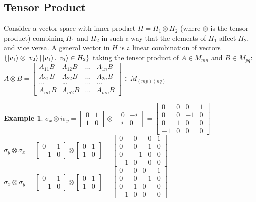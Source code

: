 \documentclass[12pt]{article}
\theoremstyle{plain}
\theoremstyle{nonumberplain}
\theoremstyle{plain}
\newtheorem{example}[lemma]{Example}
\theoremstyle{nonumberplain}
\newcommand\1{{\bf 1}}
\newcommand{\bmat}[1]{\begin{bmatrix*} #1 \end{bmatrix*}} %
\newcommand{\<}{\left\langle}
\renewcommand{\>}{\right\rangle}
\begin{document}
\subsection{Tensor Product}
Consider a vector space with inner product $H=H_1\otimes H_2$ (where $\otimes$ is the tensor product) combining $H_1$ and $H_2$ in such a way that the elements of $H_1$ affect $H_2$, and vice versa. A general vector in $H$ is a linear combination of vectors $\lbrace\ket{v_1}\otimes\ket{v_2}\vert\ket{v_1},\ket{v_2}\in H_2\rbrace$ taking the tensor product of $A\in M_{mn}$ and $B\in M_{pq}$: \\
$A\otimes B=\bmat{
A_{11}B & A_{12}B & ... & A_{1n}B \\
A_{21}B & A_{22}B & ... & A_{2n}B \\
... & ... & ... & ... \\
A_{m1}B & A_{m2}B & ... & A_{mn}B
}\in M_{(mp)(nq)}$

\begin{example}
$\sigma_x\otimes i\sigma_y=\bmat{0 & 1 \\ 1 & 0}\otimes\bmat{0 & -i \\ i & 0}=
\bmat{
0 & 0 & 0 & 1 \\
0 & 0 & -1 & 0 \\
0 & 1 & 0 & 0 \\
-1 & 0 & 0 & 0
}$ \\
$\sigma_y\otimes \sigma_x=\bmat{0 & 1 \\ -1 & 0}\otimes\bmat{0 & 1 \\ 1 & 0}=
\bmat{
0 & 0 & 0 & 1 \\
0 & 0 & 1 & 0 \\
0 & -1 & 0 & 0 \\
-1 & 0 & 0 & 0
}$ \\
$\sigma_x\otimes \sigma_y=\bmat{0 & 1 \\ -1 & 0}\otimes\bmat{0 & 1 \\ 1 & 0}=
\bmat{
0 & 0 & 0 & 1 \\
0 & 0 & -1 & 0 \\
0 & 1 & 0 & 0 \\
-1 & 0 & 0 & 0
}$
\end{example}

\end{document}
